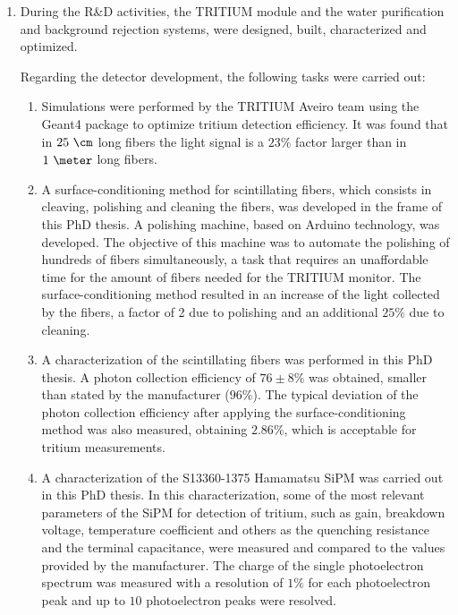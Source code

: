 \begin{enumerate}
\item{} During the R\&D activities, the TRITIUM module and the water purification and background rejection systems, were designed, built, characterized and optimized. 

Regarding the detector development, the following tasks were carried out:

\begin{enumerate}
\item{} Simulations were performed by the TRITIUM Aveiro team using the Geant4 package to optimize tritium detection efficiency. It was found that in $25~\cm$ long fibers the light signal is a $23\%$ factor larger than in $1~\meter$ long fibers. %

\item{} A surface-conditioning method for scintillating fibers, which consists in cleaving, polishing and cleaning the fibers, was developed in the frame of this PhD thesis. A polishing machine, based on Arduino technology, was developed. The objective of this machine was to automate the polishing of hundreds of fibers simultaneously, a task that requires an unaffordable time for the amount of fibers needed for the TRITIUM monitor. The surface-conditioning method resulted in an increase of the light collected by the fibers, a factor of 2 due to polishing and an additional $25\%$ due to cleaning. 

\item{} A characterization of the scintillating fibers was performed in this PhD thesis. A photon collection efficiency of $76\pm 8\%$ was obtained, smaller than stated by the manufacturer ($96\%$). The typical deviation of the photon collection efficiency after applying the surface-conditioning method was also measured, obtaining $2.86\%$, which is acceptable for tritium measurements.

\item{} A characterization of the S13360-1375 Hamamatsu SiPM was carried out in this PhD thesis. In this characterization, some of the most relevant parameters of the SiPM for detection of tritium, such as gain, breakdown voltage, temperature coefficient and others as the quenching resistance and the terminal capacitance, were measured and compared to the values provided by the manufacturer. The charge of the single photoelectron spectrum was measured with a resolution of $1\%$ for each photoelectron peak and up to $10$ photoelectron peaks were resolved. %


\end{enumerate}
\end{enumerate}

